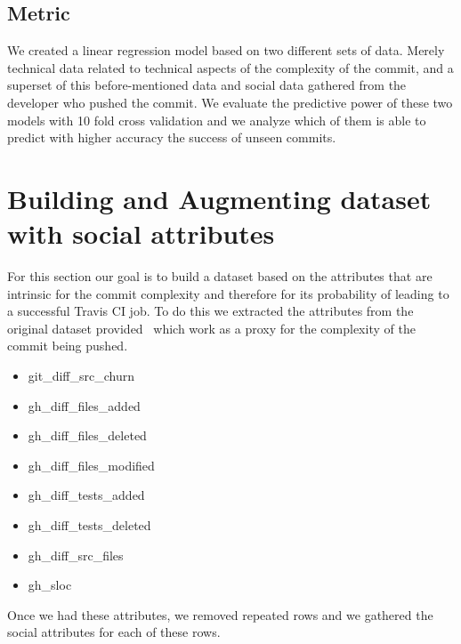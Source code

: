 \documentclass[10pt, conference]{IEEEtran}
\begin{document}
\subsection{Metric}
We created a linear regression model based on two different sets of data. Merely 
technical data related to technical aspects of the complexity of the commit, and 
a superset of this before-mentioned data and social data gathered from the 
developer who pushed the commit. We evaluate the predictive power of these two 
models with 10 fold cross validation and we analyze which of them is able to 
predict with higher accuracy the success of unseen commits.

\section{Building and Augmenting dataset with social attributes} 
\label{approach}
For this section our goal is to build a dataset based on the attributes that are 
intrinsic for the commit complexity and therefore for its probability of leading 
to a successful Travis CI job.
To do this we extracted the attributes from the original dataset 
provided~\cite{msr17challenge} which work as a proxy for the complexity of the 
commit being pushed.
\begin{itemize}
\item git\_diff\_src\_churn 
\item gh\_diff\_files\_added 
\item gh\_diff\_files\_deleted 
\item gh\_diff\_files\_modified 
\item gh\_diff\_tests\_added 
\item gh\_diff\_tests\_deleted 
\item gh\_diff\_src\_files 
\item gh\_sloc 
\end{itemize}

Once we had these attributes, we removed repeated rows and we gathered the 
social attributes for each of these rows. 
\end{document}
